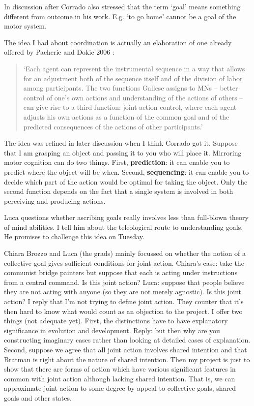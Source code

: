 \documentclass[14pt,a4paper]{extarticle}
\begin{document}
In discussion after Corrado also stressed that the term `goal' means something different from outcome in his work.
E.g. `to go home' cannot be a goal of the motor system.

The idea I had about coordination is actually an elaboration of one already offered by Pacherie and Dokic 2006 :
%
\begin{quote}
`Each agent can represent the instrumental sequence in a way that allows for an adjustment both of the sequence itself and of the division of labor among participants. The two functions Gallese assigns to MNs – better control of one’s own actions and understanding of the actions of others – can give rise to a third function: joint action control, where each agent adjusts his own actions as a function of the common goal and of the predicted consequences of the actions of other participants.'
\citep[p.\ 111]{Pacherie:2006dl}
\end{quote}

The idea was refined in later discussion when I think Corrado got it.
Suppose that I am grasping an object and passing it to you who will place it.
Mirroring motor cognition can do two things.
First, \textbf{prediction}: it can enable you to predict where the object will be when.
Second, \textbf{sequencing}: it can enable you to decide which part of the action would be optimal for taking the object.
Only the second function depends on the fact that a single system is involved in both perceiving and producing actions.

Luca questions whether ascribing goals really involves less than full-blown theory of mind abilities.  
I tell him about the teleological route to understanding goals.  
He promises to challenge this idea on Tuesday.

Chiara Brozzo and Luca (the grads) mainly focussed on whether the notion of a collective goal gives sufficient conditions for joint action.
Chiara's case: take the communist bridge painters but suppose that each is acting under instructions from a central command.
Is this joint action?
Luca: suppose that people believe they are not acting with anyone (so they are not merely agnostic).  Is this joint action?
I reply that I'm not trying to define joint action.
They counter that it's then hard to know what would count as an objection to the project.
I offer two things (not adequate yet).  
First, the distinctions have to have explanatory significance in evolution and development.  Reply: but then why are you constructing imaginary cases rather than looking at detailed cases of explanation.  
Second, suppose we agree that all joint action involves shared intention and that Bratman is right about the nature of shared intention.  
Then my project is just to show that there are forms of action which have various significant features in common with joint action although lacking shared intention.  That is, we can approximate joint action to some degree by appeal to collective goals, shared goals and other states.
\end{document}

